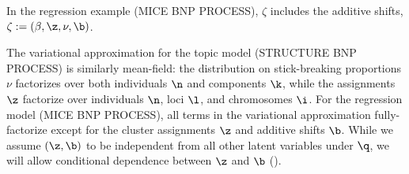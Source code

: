
\hrulefill

In the regression example (MICE BNP PROCESS), $\zeta$ includes
the additive shifts, $\zeta := (\beta, \z, \nu, \b)$.

The variational approximation for the topic model
(STRUCTURE BNP PROCESS) is similarly mean-field: the distribution on
stick-breaking proportions $\nu$ factorizes over both individuals $\n$ and
components $\k$, while the assignments $\z$ factorize over individuals $\n$,
loci $\l$, and chromosomes $\i$. For the regression model
(MICE BNP PROCESS), all terms in the variational approximation
fully-factorize except for the cluster assignments $\z$ and additive shifts
$\b$. While we assume $(\z, \b)$ to be independent from all other latent
variables under $\q$, we will allow conditional dependence between $\z$ and $\b$
().




\hrulefill


